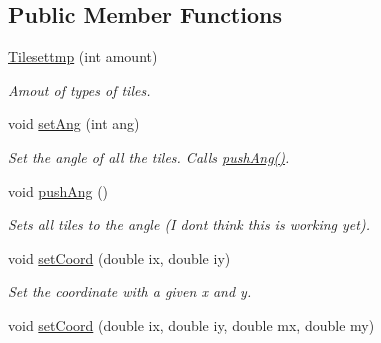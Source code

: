 \subsection*{Public Member Functions}
\begin{DoxyCompactItemize}
\item 
\hyperlink{classTilesettmp_afda7dcda2169a9b761263ba05357b0da}{Tilesettmp} (int amount)\hypertarget{classTilesettmp_afda7dcda2169a9b761263ba05357b0da}{}\label{classTilesettmp_afda7dcda2169a9b761263ba05357b0da}

\begin{DoxyCompactList}\small\item\em Amout of types of tiles. \end{DoxyCompactList}\item 
void \hyperlink{classTilesettmp_a2251a7ac488cadd16cd5ded1726dc85a}{set\+Ang} (int ang)\hypertarget{classTilesettmp_a2251a7ac488cadd16cd5ded1726dc85a}{}\label{classTilesettmp_a2251a7ac488cadd16cd5ded1726dc85a}

\begin{DoxyCompactList}\small\item\em Set the angle of all the tiles. Calls \hyperlink{classTilesettmp_a807f8e7b30f7705693b9b26a8991d791}{push\+Ang()}. \end{DoxyCompactList}\item 
void \hyperlink{classTilesettmp_a807f8e7b30f7705693b9b26a8991d791}{push\+Ang} ()\hypertarget{classTilesettmp_a807f8e7b30f7705693b9b26a8991d791}{}\label{classTilesettmp_a807f8e7b30f7705693b9b26a8991d791}

\begin{DoxyCompactList}\small\item\em Sets all tiles to the angle (I don\textquotesingle{}t think this is working yet). \end{DoxyCompactList}\item 
void \hyperlink{classTilesettmp_aca6e1dea7cbbda0b240260f0d5f4f37a}{set\+Coord} (double ix, double iy)\hypertarget{classTilesettmp_aca6e1dea7cbbda0b240260f0d5f4f37a}{}\label{classTilesettmp_aca6e1dea7cbbda0b240260f0d5f4f37a}

\begin{DoxyCompactList}\small\item\em Set the coordinate with a given x and y. \end{DoxyCompactList}\item 
void \hyperlink{classTilesettmp_af90ca4d34ec0f1a2c61934d554f5cdba}{set\+Coord} (double ix, double iy, double mx, double my)\hypertarget{classTilesettmp_af90ca4d34ec0f1a2c61934d554f5cdba}{}\label{classTilesettmp_af90ca4d34ec0f1a2c61934d554f5cdba}


\end{DoxyCompactItemize}
